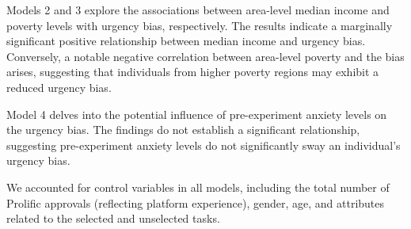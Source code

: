 \documentclass[
]{report}
\begin{document}
Models 2 and 3 explore the associations between area-level median income
and poverty levels with urgency bias, respectively. The results indicate
a marginally significant positive relationship between median income and
urgency bias. Conversely, a notable negative correlation between
area-level poverty and the bias arises, suggesting that individuals from
higher poverty regions may exhibit a reduced urgency bias.

Model 4 delves into the potential influence of pre-experiment anxiety
levels on the urgency bias. The findings do not establish a significant
relationship, suggesting pre-experiment anxiety levels do not
significantly sway an individual's urgency bias.

We accounted for control variables in all models, including the total
number of Prolific approvals (reflecting platform experience), gender,
age, and attributes related to the selected and unselected tasks.
\end{document}
